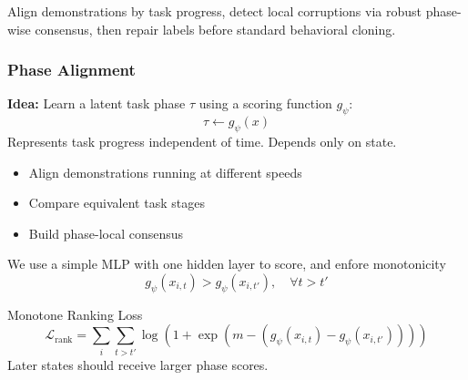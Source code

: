 \documentclass{beamer}
\begin{document}
\begin{frame}

    \vspace{0.75em}

    \scriptsize{
        Align demonstrations by task progress, detect local corruptions via robust phase-wise consensus,
        then repair labels before standard behavioral cloning.
    }

\end{frame}

\begin{frame}
    \frametitle{\textbf{Phase Alignment}}

    \textbf{Idea:}
    Learn a latent task phase $\tau$ using a scoring function $g_\psi$:
    \[
        \tau \leftarrow g_\psi(x)
    \]
    Represents task progress independent of time.
    Depends only on state.

    \begin{itemize}
        \item Align demonstrations running at different speeds
        \item Compare equivalent task stages
        \item Build phase-local consensus
    \end{itemize}

    We use a simple MLP with one hidden layer to score, and enfore monotonicity
    \[
        g_\psi(x_{i, t}) > g_\psi(x_{i, t'}), \quad \forall t > t'
    \]

    \begin{block}{Monotone Ranking Loss}
        \[
            \mathcal{L}_{\mathrm{rank}}
            =
            \sum_{i}
            \sum_{t>t'}
            \log
            \left(
                1+
                \exp{\left(m-(g_\psi(x_{i, t})-g_\psi(x_{i, t'}))\right)}
            \right)
        \]
        \small
        Later states should receive larger phase scores.
    \end{block}

\end{frame}
\end{document}
